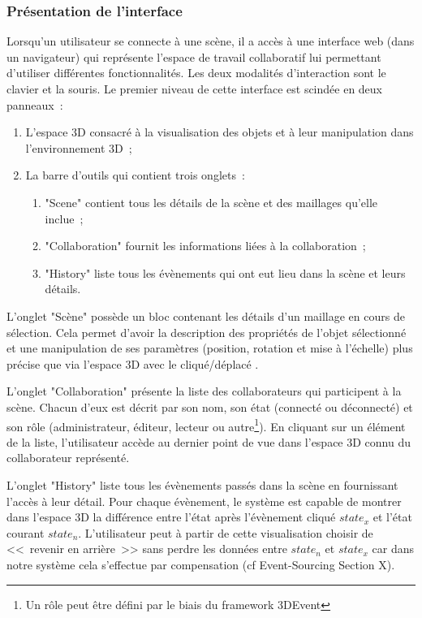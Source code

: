 \subsubsection{Présentation de l'interface}

Lorsqu'un utilisateur se connecte à une scène, il a accès à une interface web 
(dans un navigateur) qui représente l'espace de travail collaboratif lui permettant 
d'utiliser différentes fonctionnalités. Les deux modalités d'interaction sont le clavier 
et la souris. Le premier niveau de cette 
interface est scindée en deux panneaux~: 
\begin{enumerate}
	\item L'espace 3D consacré à la visualisation des objets et à leur manipulation 
	dans l'environnement 3D~;
	\item La barre d'outils qui contient trois onglets~:~
	\begin{enumerate}
		\item "Scene" contient tous les détails de la scène et des maillages qu'elle 
		inclue~; 
		\item "Collaboration" fournit les informations liées à la collaboration~;
		\item "History" liste tous les évènements qui ont eut lieu dans la scène et 
		leurs  détails. 
	\end{enumerate}
\end{enumerate}

L'onglet "Scène" possède un bloc contenant les détails d'un maillage en cours de 
sélection. Cela permet d'avoir la description des propriétés de l'objet sélectionné et 
une manipulation de ses paramètres (position, rotation et mise à l'échelle) plus 
précise que via l'espace 3D avec le cliqué/déplacé .

L'onglet "Collaboration" présente la liste des collaborateurs qui participent à la 
scène. Chacun d'eux est décrit par son nom, son état  (connecté ou déconnecté) 
et son rôle (administrateur, éditeur, lecteur ou autre\footnote{Un rôle peut être 
défini par le biais du \gls{framework} 3DEvent}). En cliquant sur un élément de la 
liste, l'utilisateur accède au dernier point de vue dans l'espace 3D connu du 
collaborateur représenté.

L'onglet "History" liste tous les évènements passés dans la scène en fournissant 
l'accès à leur détail. Pour chaque évènement, le système est capable de montrer 
dans l'espace 3D la différence entre l'état  après l'évènement cliqué $state_x$ et 
l'état courant $state_n$. L'utilisateur peut à partir de cette visualisation choisir de 
<<~revenir en arrière~>> sans perdre les données entre $state_n$ et $state_x$ 
car dans notre système cela s'effectue par compensation (cf Event-Sourcing 
Section X).

